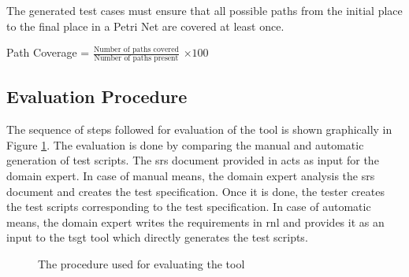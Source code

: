\begin{definition}
\label{def:def8}

The generated test cases must ensure that all possible paths from the initial place to the final place in a Petri Net are covered at least once.

Path Coverage = $\displaystyle\frac{\mbox{Number of paths covered}}{\mbox{Number of paths present}}$  $\times 100$
\end{definition}

\subsection{Evaluation Procedure}
The sequence of steps followed for evaluation of the tool is shown graphically in Figure \ref{fig:chap6fig1}. The evaluation is done by comparing the manual and automatic generation of test scripts. The \gls{srs} document provided in \cite{blazysoftware} acts as input for the domain expert. In case of manual means, the domain expert analysis the \gls{srs} document and creates the test specification. Once it is done, the tester creates the test scripts corresponding to the test specification. In case of automatic means, the domain expert writes the requirements in \gls{rnl} and provides it as an input to the \gls{tsgt} tool which directly generates the test scripts.

\begin{figure}[htb!]
\centering
{}
\caption{The procedure used for evaluating the tool}
\label{fig:chap6fig1}
\end{figure}

